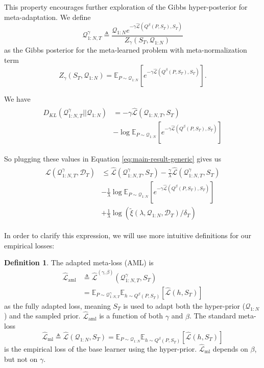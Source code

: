 \documentclass[letterpaper]{article} %
\theoremstyle{definition}
\newtheorem{defn}{Definition}[section]
\newcommand{\Expect}[2]{\mathbb{E}_{#1}\left [#2 \right ]}
\begin{document}
This property encourages further exploration of the Gibbs hyper-posterior for meta-adaptation. We define 
\begin{equation} \label{eq:aml-post-defn}
\mathcal{Q}^{\gamma}_{1:N,T}\triangleq \frac{\mathcal{Q}_{1:N}e^{-\gamma\hat{\mathcal{L}}(Q^\beta(P,S_T),S_T)}}{Z_\gamma(S_T, \mathcal{Q}_{1:N})}
\end{equation} 
as the Gibbs posterior for the meta-learned problem with meta-normalization term $$Z_\gamma(S_T, \mathcal{Q}_{1:N})=\Expect{P\sim \mathcal{Q}_{1:N}}{e^{-\gamma\hat{\mathcal{L}}(Q^\beta(P,S_T),S_T)}}.$$

We have 
\begin{align*} 
\begin{split}
D_{KL}(\mathcal{Q}^{\gamma}_{1:N,T}||\mathcal{Q}_{1:N})&=
-\gamma\hat{\mathcal{L}}(\mathcal{Q}_{1:N,T}, S_T)\\
&-\log\Expect{P\sim \mathcal{Q}_{1:N}}{e^{-\gamma\hat{\mathcal{L}}(Q^\beta(P,S_T),S_T)}}
\end{split}
\end{align*}

So plugging these values in Equation \ref{eq:main-result-generic} gives us
\begin{align*} 
\begin{split}
\mathcal{L}(\mathcal{Q}^{\gamma}_{1:N,T}, \mathcal{D}_T) & \leq \hat{\mathcal{L}}(\mathcal{Q}^{\gamma}_{1:N,T}, S_T) -\frac{\gamma}{\lambda}\hat{\mathcal{L}}(\mathcal{Q}^{\gamma}_{1:N,T}, S_T) \\ &- \frac{1}{\lambda}\log\Expect{P\sim \mathcal{Q}_{1:N}}{e^{-\gamma\hat{\mathcal{L}}(Q^\beta(P,S_T),S_T)}}\\ &+\frac{1}{\lambda}\log\left (\tilde{\xi}(\lambda,\mathcal{Q}_{1:N},\mathcal{D}_T)/\delta_T\right )
\end{split}
\end{align*}

In order to clarify this expression, we will use more intuitive definitions for our empirical losses:
\begin{defn}
	The adapted meta-loss (AML) is  
	\begin{align*} 
	\hat{\mathcal{L}}_{\mathrm{aml}} &\triangleq  \hat{\mathcal{L}}^{(\gamma,\beta)}(\mathcal{Q}^{\gamma}_{1:N,T}, S_T)\\
	&=\mathbb{E}_{P\sim \mathcal{Q}^{\gamma}_{1:N,T}}\mathbb{E}_{h\sim Q^{\beta}(P,S_T)}\left [\hat{\mathcal{L}}(h, S_T)\right ]
	\end{align*} 
	as the fully adapted loss, meaning $S_T$ is used to adapt both the hyper-prior ($\mathcal{Q}_{1:N}$) and the sampled prior. $\hat{\mathcal{L}}_{\mathrm{aml}}$ is a function of both $\gamma$ and $\beta$. The standard meta-loss 
	$$
	\hat{\mathcal{L}}_{\mathrm{ml}}\triangleq \hat{\mathcal{L}}(\mathcal{Q}_{1:N}, S_T)=\mathbb{E}_{P\sim \mathcal{Q}_{1:N}}\mathbb{E}_{h\sim Q^{\beta}(P,S_T)}\left [\hat{\mathcal{L}}(h, S_T)\right ]
	$$ 
	is the empirical loss of the base learner using the hyper-prior. 
	$\hat{\mathcal{L}}_{\mathrm{ml}}$ depends on $\beta$, but not on $\gamma$.
\end{defn}
\end{document}
